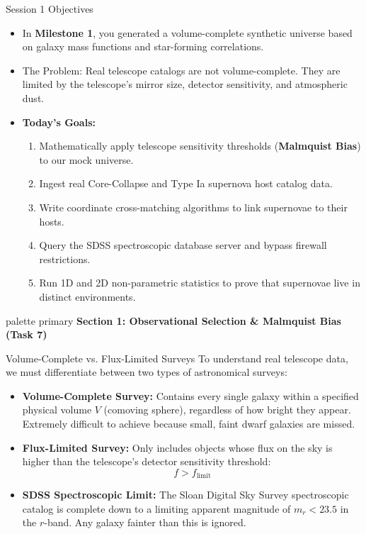 \documentclass[9pt]{beamer}
\begin{document}
\begin{frame}{Session 1 Objectives}
  \begin{itemize}
    \item In \textbf{Milestone 1}, you generated a volume-complete synthetic universe based on galaxy mass functions and star-forming correlations.
    \item \alert{The Problem:} Real telescope catalogs are not volume-complete. They are limited by the telescope's mirror size, detector sensitivity, and atmospheric dust.
    \item \textbf{Today's Goals:}
      \begin{enumerate}
        \item Mathematically apply telescope sensitivity thresholds (\textbf{Malmquist Bias}) to our mock universe.
        \item Ingest real Core-Collapse and Type Ia supernova host catalog data.
        \item Write coordinate cross-matching algorithms to link supernovae to their hosts.
        \item Query the SDSS spectroscopic database server and bypass firewall restrictions.
        \item Run 1D and 2D non-parametric statistics to prove that supernovae live in distinct environments.
      \end{enumerate}
  \end{itemize}
\end{frame}

\begin{frame}[plain]
  \vfill
  \centering
  \begin{beamercolorbox}[sep=8pt,center,shadow=true,rounded=true]{palette primary}
    \textbf{Section 1: Observational Selection \& Malmquist Bias (Task 7)}
  \end{beamercolorbox}
  \vfill
\end{frame}

\begin{frame}{Volume-Complete vs. Flux-Limited Surveys}
  To understand real telescope data, we must differentiate between two types of astronomical surveys:
  \begin{itemize}
    \item \textbf{Volume-Complete Survey:}
      Contains every single galaxy within a specified physical volume $V$ (comoving sphere), regardless of how bright they appear. Extremely difficult to achieve because small, faint dwarf galaxies are missed.
    \item \textbf{Flux-Limited Survey:}
      Only includes objects whose flux on the sky is higher than the telescope's detector sensitivity threshold:
      $$f > f_{\text{limit}}$$
    \item \textbf{SDSS Spectroscopic Limit:}
      The Sloan Digital Sky Survey spectroscopic catalog is complete down to a limiting apparent magnitude of $m_r < 23.5$ in the $r$-band. Any galaxy fainter than this is ignored.
  \end{itemize}
\end{frame}
\end{document}
